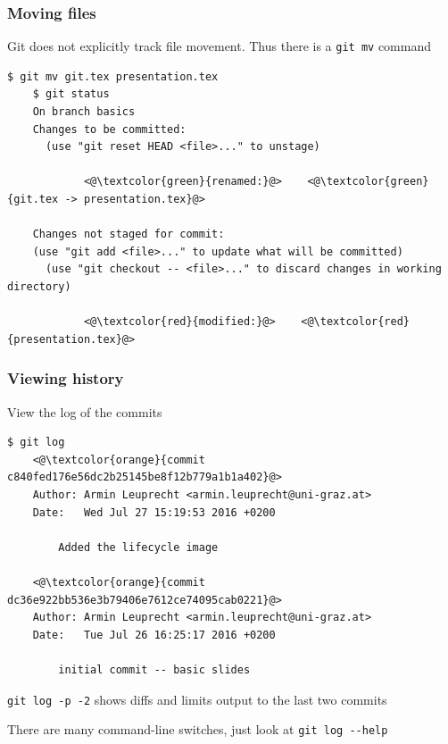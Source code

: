 \documentclass{beamer}
\begin{document}
\begin{frame}[fragile]
  \frametitle{Moving files}
  Git does not explicitly track file movement. Thus there is a \lstinline{git mv} command
  \begin{lstlisting}[basicstyle=\ttfamily\tiny]
    $ git mv git.tex presentation.tex
    $ git status
    On branch basics
    Changes to be committed:
      (use "git reset HEAD <file>..." to unstage)

            <@\textcolor{green}{renamed:}@>    <@\textcolor{green}{git.tex -> presentation.tex}@>

    Changes not staged for commit:
    (use "git add <file>..." to update what will be committed)
      (use "git checkout -- <file>..." to discard changes in working directory)

            <@\textcolor{red}{modified:}@>    <@\textcolor{red}{presentation.tex}@>
  \end{lstlisting}
\end{frame}

\begin{frame}[fragile]
  \frametitle{Viewing history}
  View the log of the commits
  \begin{lstlisting}[basicstyle=\ttfamily\tiny]
    $ git log
    <@\textcolor{orange}{commit c840fed176e56dc2b25145be8f12b779a1b1a402}@>
    Author: Armin Leuprecht <armin.leuprecht@uni-graz.at>
    Date:   Wed Jul 27 15:19:53 2016 +0200

        Added the lifecycle image

    <@\textcolor{orange}{commit dc36e922bb536e3b79406e7612ce74095cab0221}@>
    Author: Armin Leuprecht <armin.leuprecht@uni-graz.at>
    Date:   Tue Jul 26 16:25:17 2016 +0200

        initial commit -- basic slides
  \end{lstlisting}

  \lstinline{git log -p -2} shows diffs and limits output to the last two commits

  There are many command-line switches, just look at \lstinline{git log --help}
\end{frame}
\end{document}
